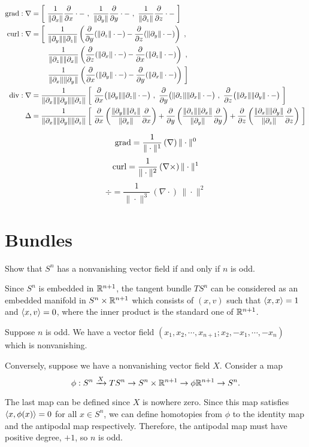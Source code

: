 \documentclass[12pt]{article}
\begin{document}
\begin{align*}
\grad:\nabla&=\left[\ \frac1{\|\pd_x\|}\pd{x}\cdot-\ ,\ \frac1{\|\pd_y\|}\pd{y}\cdot-\ ,\ \frac1{\|\pd_z\|}\pd{z}\cdot-\ \right]\\
\curl:\nabla&=\left[\ \frac1{\|\pd_y\|\|\pd_z\|}\left(\pd{y}(\|\pd_z\|\cdot-)-\pd{z}(\|\pd_y\|\cdot-)\right)\ ,\right.\\
&\qquad\left.\frac1{\|\pd_z\|\|\pd_x\|}\left(\pd{z}(\|\pd_x\|\cdot-)-\pd{x}(\|\pd_z\|\cdot-)\right)\ ,\right.\\
&\qquad\left.\frac1{\|\pd_x\|\|\pd_y\|}\left(\pd{x}(\|\pd_y\|\cdot-)-\pd{y}(\|\pd_x\|\cdot-)\right)\ \right]\\
\div:\nabla&=\frac1{\|\pd_x\|\|\pd_y\|\|\pd_z\|}\left[\ \pd{x}\bigl(\|\pd_y\|\|\pd_z\|\cdot-\bigr)\ ,\ \pd{y}\bigl(\|\pd_z\|\|\pd_x\|\cdot-\bigr)\ ,\ \pd{z}\bigl(\|\pd_x\|\|\pd_y\|\cdot-\bigr)\ \right]\\
\Delta&=\frac1{\|\pd_x\|\|\pd_y\|\|\pd_z\|}\left[\ \pd{x}\left(\frac{\|\pd_y\|\|\pd_z\|}{\|\pd_x\|}\pd{x}\right)+\pd{y}\left(\frac{\|\pd_z\|\|\pd_x\|}{\|\pd_y\|}\pd{y}\right)+\pd{z}\left(\frac{\|\pd_x\|\|\pd_y\|}{\|\pd_z\|}\pd{z}\right)\ \right]
\end{align*}

\bigskip

\[\operatorname{grad}=\frac1{\|\cdot\|^1}\,(\nabla)\,\|\cdot\|^0\]
\[\operatorname{curl}=\frac1{\|\cdot\|^2}\,(\nabla\times)\,\|\cdot\|^1\]
\[\div=\frac1{\|\cdot\|^3}\,(\nabla\cdot)\,\|\cdot\|^2\]




\section{Bundles}
Show that $S^n$ has a nonvanishing vector field if and only if $n$ is odd.
\begin{sol}
Since $S^n$ is embedded in $\mathbb{R}^{n+1}$, the tangent bundle $TS^n$ can be considered as an embedded manifold in $S^n\times\mathbb{R}^{n+1}$ which consists of $(x,v)$ such that $\langle x,x\rangle=1$ and $\langle x,v\rangle=0$, where the inner product is the standard one of $\mathbb{R}^{n+1}$.

Suppose $n$ is odd.
We have a vector field
$(x_1,x_2,\cdots,x_{n+1};x_2,-x_1,\cdots,-x_n)$
which is nonvanishing.

Conversely, suppose we have a nonvanishing vector field $X$.
Consider a map
\[\phi:S^n\xrightarrow{X}TS^n\to S^n\times\mathbb{R}^{n+1}\to{\phi}\mathbb{R}^{n+1}\to S^n.\]

The last map can be defined since $X$ is nowhere zero. Since this map satisfies $\langle x,\phi(x)\rangle=0$ for all $x\in S^n$, we can define homotopies from $\phi$ to the identity map and the antipodal map respectively. Therefore, the antipodal map must have positive degree, $+1$, so $n$ is odd.
\end{sol}
\end{document}
